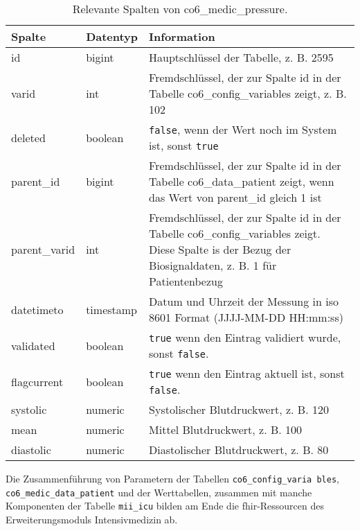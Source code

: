 \begin{longtable}{|l|l|p{8cm}|}
	\caption[Relevante Spalten von co6\_medic\_pressure]{Relevante Spalten von co6\_medic\_pressure.}
	\label{tab:valuepress}
	\endfirsthead
		\hline
		\rowcolor{lightgray} Spalte & Datentyp & Information \\ \hline
		id & bigint & Hauptschlüssel der Tabelle, z. B. 2595 \\ \hline
		varid & int & Fremdschlüssel, der zur Spalte id in der Tabelle co6\_config\_variables zeigt, z. B. 102 \\ \hline
		deleted & boolean & \texttt{false}, wenn der Wert noch im System ist, sonst \texttt{true} \\ \hline
		parent\_id & bigint & Fremdschlüssel, der zur Spalte id in der Tabelle co6\_data\_patient zeigt, wenn das Wert von parent\_id gleich 1 ist \\ \hline
		parent\_varid & int & Fremdschlüssel, der zur Spalte id in der Tabelle co6\_config\_variables zeigt. Diese Spalte is der Bezug der Biosignaldaten, z. B. 1 für Patientenbezug \\ \hline
		datetimeto & timestamp & Datum und Uhrzeit der Messung in \acs{iso} 8601 Format (JJJJ-MM-DD HH:mm:ss)\\ \hline
		validated & boolean & \texttt{true} wenn den Eintrag validiert wurde, sonst \texttt{false}. \\ \hline
		flagcurrent & boolean & \texttt{true} wenn den Eintrag aktuell ist, sonst \texttt{false}. \\ \hline
		systolic & numeric & Systolischer Blutdruckwert, z. B. 120 \\ \hline
		mean & numeric & Mittel Blutdruckwert, z. B. 100 \\ \hline
		diastolic & numeric & Diastolischer Blutdruckwert, z. B. 80 \\ \hline
\end{longtable}

Die Zusammenführung von Parametern der Tabellen \texttt{co6\_config\_varia bles}, \texttt{co6\_medic\_data\_patient} und der Werttabellen, zusammen mit manche Komponenten der Tabelle \texttt{mii\_icu} bilden am Ende die \ac{fhir}-Ressourcen des Erweiterungsmoduls \glqq Intensivmedizin\grqq{} ab.